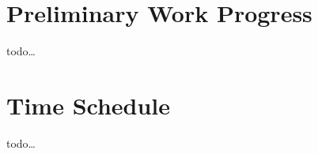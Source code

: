 \documentclass[12pt]{article} %
\begin{document}

\section{Preliminary Work Progress} %
todo\dots


\section{Time Schedule} %
todo\dots


%



\end{document}
